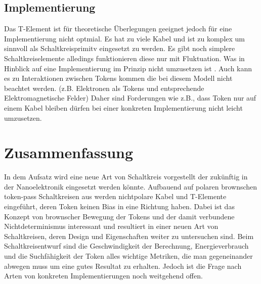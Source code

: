 \documentclass[11pt,a4paper]{article}
\begin{document}

\subsection{Implementierung}
Das T-Element ist für theoretische Überlegungen geeignet jedoch für eine
Implementierung nicht optmial.
%
Es hat zu viele Kabel und ist zu komplex um sinnvoll als Schaltkreisprimitv
eingesetzt zu werden. 
%
Es gibt noch simplere Schaltkreiselemente \cite{Peper_Fundamentals_2013}
alledings funktionieren diese nur mit Fluktuation. 
%
Was in Hinblick auf eine Implementierung im Prinzip nicht umzusetzen ist 
\cite{Peper_Fundamentals_2013}.
%
Auch kann es zu Interaktionen zwischen Tokens kommen die bei diesem Modell
nicht beachtet werden. (z.B. Elektronen als Tokens und entsprechende 
Elektromagnetische Felder)
%
Daher sind Forderungen wie z.B., dass Token nur auf einem Kabel 
bleiben dürfen bei einer konkreten Implementierung nicht leicht umzusetzen.



\section{Zusammenfassung}
In dem Aufsatz \cite{Peper_nonPolar_2018} wird eine neue Art
von Schaltkreis vorgestellt der zukünftig in der Nanoelektronik eingesetzt
werden könnte.
%
Aufbauend auf polaren brownschen token-pass Schaltkreisen aus 
\cite{Peper_Fundamentals_2013} werden nichtpolare Kabel und T-Elemente 
eingeführt, deren Token keinen Bias in eine Richtung haben. 
%
Dabei ist das Konzept von brownscher Bewegung der Tokens und der damit
verbundene Nichtdeterminismus interessant und resultiert in einer neuen Art von
Schaltkreisen, deren Design und Eigenschaften weiter zu untersuchen sind.
%
Beim Schaltkreisentwurf sind die Geschwindigkeit der Berechnung, 
Energieverbrauch und die Suchfähigkeit der Token alles wichtige Metriken,
die man gegeneinander abwegen muss um eine gutes Resultat zu erhalten.
%
Jedoch ist die Frage nach Arten von konkreten Implementierungen 
noch weitgehend offen.





\end{document}
